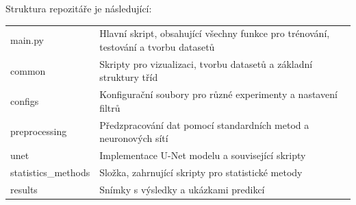 \documentclass[male,czech,api_ing]{thesis}
\begin{document}
Struktura repozitáře je následující:
\begin{longtable}{ll}
\hline
main.py & Hlavní skript, obsahující všechny funkce pro trénování, testování a tvorbu datasetů \\
common & Skripty pro vizualizaci, tvorbu datasetů a základní struktury tříd \\
configs & Konfigurační soubory pro různé experimenty a nastavení filtrů \\
preprocessing & Předzpracování dat pomocí standardních metod a neuronových sítí \\
unet & Implementace U-Net modelu a související skripty \\
statistics\_methods & Složka, zahrnující skripty pro statistické metody \\
results & Snímky s výsledky a ukázkami predikcí \\
\hline
\end{longtable}

\end{document}
